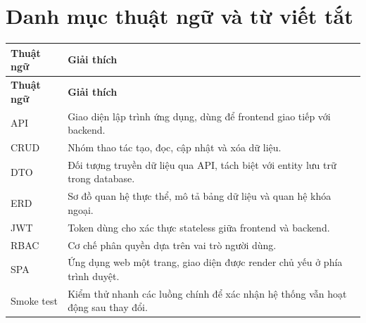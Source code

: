 \documentclass[12pt,a4paper,oneside]{extreport}
\begin{document}
\chapter*{Danh mục thuật ngữ và từ viết tắt}
\begin{longtable}{p{}p{}}
\toprule
\textbf{Thuật ngữ} & \textbf{Giải thích} \\
\midrule
\endfirsthead
\toprule
\textbf{Thuật ngữ} & \textbf{Giải thích} \\
\midrule
\endhead
API & Giao diện lập trình ứng dụng, dùng để frontend giao tiếp với backend. \\
CRUD & Nhóm thao tác tạo, đọc, cập nhật và xóa dữ liệu. \\
DTO & Đối tượng truyền dữ liệu qua API, tách biệt với entity lưu trữ trong database. \\
ERD & Sơ đồ quan hệ thực thể, mô tả bảng dữ liệu và quan hệ khóa ngoại. \\
JWT & Token dùng cho xác thực stateless giữa frontend và backend. \\
RBAC & Cơ chế phân quyền dựa trên vai trò người dùng. \\
SPA & Ứng dụng web một trang, giao diện được render chủ yếu ở phía trình duyệt. \\
Smoke test & Kiểm thử nhanh các luồng chính để xác nhận hệ thống vẫn hoạt động sau thay đổi. \\
\bottomrule
\end{longtable}

\clearpage
\tableofcontents
\clearpage
\begingroup
{}
\setlength{\parskip}{0pt}
{}
\listoffigures
\endgroup
\clearpage
\begingroup
{}
\setlength{\parskip}{0pt}
{}
\listoftables
\endgroup
\clearpage








\appendix

\end{document}
